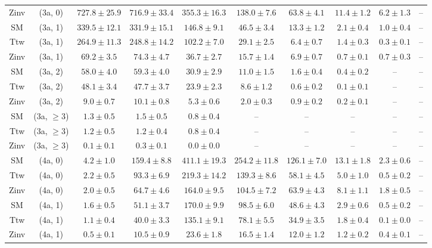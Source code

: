 \begin{table}[h!]
{\begin{tabular}{cccccccccc}
	Zinv & (3a, 0) & $727.8\pm 25.9$ & $716.9\pm 33.4$ & $355.3\pm 16.3$ & $138.0\pm 7.6$ & $63.8\pm 4.1$ & $11.4\pm 1.2$ & $6.2\pm 1.3$ & -- \\[0.5ex] 
	SM & (3a, 1) & $339.5\pm 12.1$ & $331.9\pm 15.1$ & $146.8\pm 9.1$ & $46.5\pm 3.4$ & $13.3\pm 1.2$ & $2.1\pm 0.4$ & $1.0\pm 0.4$ & -- \\[0.5ex] 
	Ttw & (3a, 1) & $264.9\pm 11.3$ & $248.8\pm 14.2$ & $102.2\pm 7.0$ & $29.1\pm 2.5$ & $6.4\pm 0.7$ & $1.4\pm 0.3$ & $0.3\pm 0.1$ & -- \\[0.5ex] 
	Zinv & (3a, 1) & $69.2\pm 3.5$ & $74.3\pm 4.7$ & $36.7\pm 2.7$ & $15.7\pm 1.4$ & $6.9\pm 0.7$ & $0.7\pm 0.1$ & $0.7\pm 0.3$ & -- \\[0.5ex] 
	SM & (3a, 2) & $58.0\pm 4.0$ & $59.3\pm 4.0$ & $30.9\pm 2.9$ & $11.0\pm 1.5$ & $1.6\pm 0.4$ & $0.4\pm 0.2$ & -- & -- \\[0.5ex] 
	Ttw & (3a, 2) & $48.1\pm 3.4$ & $47.7\pm 3.7$ & $23.9\pm 2.3$ & $8.6\pm 1.2$ & $0.6\pm 0.2$ & $0.1\pm 0.1$ & -- & -- \\[0.5ex] 
	Zinv & (3a, 2) & $9.0\pm 0.7$ & $10.1\pm 0.8$ & $5.3\pm 0.6$ & $2.0\pm 0.3$ & $0.9\pm 0.2$ & $0.2\pm 0.1$ & -- & -- \\[0.5ex] 
	SM & (3a, $\ge3$) & $1.3\pm 0.5$ & $1.5\pm 0.5$ & $0.8\pm 0.4$ & -- & -- & -- & -- & -- \\[0.5ex] 
	Ttw & (3a, $\ge3$) & $1.2\pm 0.5$ & $1.2\pm 0.4$ & $0.8\pm 0.4$ & -- & -- & -- & -- & -- \\[0.5ex] 
	Zinv & (3a, $\ge3$) & $0.1\pm 0.1$ & $0.3\pm 0.1$ & $0.0\pm 0.0$ & -- & -- & -- & -- & -- \\[0.5ex] 
	SM & (4a, 0) & $4.2\pm 1.0$ & $159.4\pm 8.8$ & $411.1\pm 19.3$ & $254.2\pm 11.8$ & $126.1\pm 7.0$ & $13.1\pm 1.8$ & $2.3\pm 0.6$ & -- \\[0.5ex] 
	Ttw & (4a, 0) & $2.2\pm 0.5$ & $93.3\pm 6.9$ & $219.3\pm 14.2$ & $139.3\pm 8.6$ & $58.1\pm 4.5$ & $5.0\pm 1.0$ & $0.5\pm 0.2$ & -- \\[0.5ex] 
	Zinv & (4a, 0) & $2.0\pm 0.5$ & $64.7\pm 4.6$ & $164.0\pm 9.5$ & $104.5\pm 7.2$ & $63.9\pm 4.3$ & $8.1\pm 1.1$ & $1.8\pm 0.5$ & -- \\[0.5ex] 
	SM & (4a, 1) & $1.6\pm 0.5$ & $51.1\pm 3.7$ & $170.0\pm 9.9$ & $98.5\pm 6.0$ & $48.6\pm 4.3$ & $2.9\pm 0.6$ & $0.5\pm 0.2$ & -- \\[0.5ex] 
	Ttw & (4a, 1) & $1.1\pm 0.4$ & $40.0\pm 3.3$ & $135.1\pm 9.1$ & $78.1\pm 5.5$ & $34.9\pm 3.5$ & $1.8\pm 0.4$ & $0.1\pm 0.0$ & -- \\[0.5ex] 
	Zinv & (4a, 1) & $0.5\pm 0.1$ & $10.5\pm 0.9$ & $23.6\pm 1.8$ & $16.5\pm 1.4$ & $12.0\pm 1.2$ & $1.2\pm 0.2$ & $0.4\pm 0.1$ & -- \\[0.5ex] 

\end{tabular}}
\end{table}
